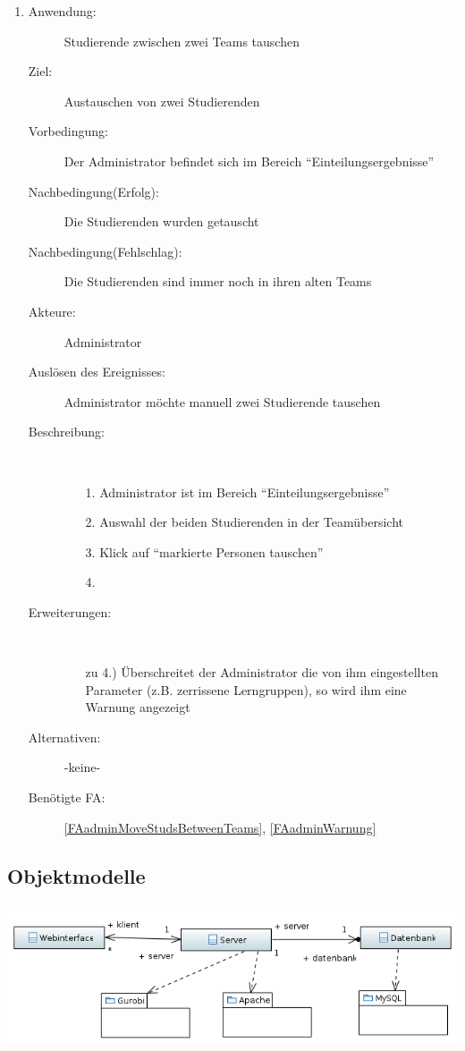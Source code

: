 \documentclass[parskip=full]{scrartcl}
\newcommand{\swtLabel}[1]{\textbf{/#1\arabic*0/}}
\begin{document}
\begin{enumerate} [label=\swtLabel{A}]
  \item \label{UCadminSwapStudsBetweenTeams}
    \begin{description}
  	\item[Anwendung:] Studierende zwischen zwei Teams tauschen
  	\item[Ziel:] Austauschen von zwei Studierenden
  	\item[Vorbedingung:] Der Administrator befindet sich im Bereich
  	\enquote{Einteilungsergebnisse}
  	\item[Nachbedingung(Erfolg):] Die Studierenden wurden getauscht
  	\item[Nachbedingung(Fehlschlag):] Die Studierenden sind immer noch in ihren
  	alten Teams
  	\item[Akteure:] Administrator
  	\item[Auslösen des Ereignisses:] Administrator möchte manuell zwei
  	Studierende tauschen
  	\item[Beschreibung:]~
  	\begin{enumerate}
  	  \item[1.] Administrator ist im Bereich \enquote{Einteilungsergebnisse}
      \item[2.] Auswahl der beiden Studierenden in der Teamübersicht
      \item[3.] Klick auf \enquote{markierte Personen tauschen}
      \item[4.] 
  	\end{enumerate}
  	\item[Erweiterungen:]~
  	\begin{enumerate}
  	  \item [zu 4.)] Überschreitet der Administrator die von ihm eingestellten
  	  Parameter (z.B. zerrissene Lerngruppen), so wird ihm eine Warnung angezeigt
  	\end{enumerate}  
  	\item[Alternativen:] -keine-
  	\item[Benötigte FA:] \ref{FAadminMoveStudsBetweenTeams}, \ref{FAadminWarnung}
  \end{description}
  
\end{enumerate}  
\subsection{Objektmodelle}

\includegraphics[width=\linewidth]{diagramme_pflichtenheft/ClassDiagram.PNG}
\end{document}
